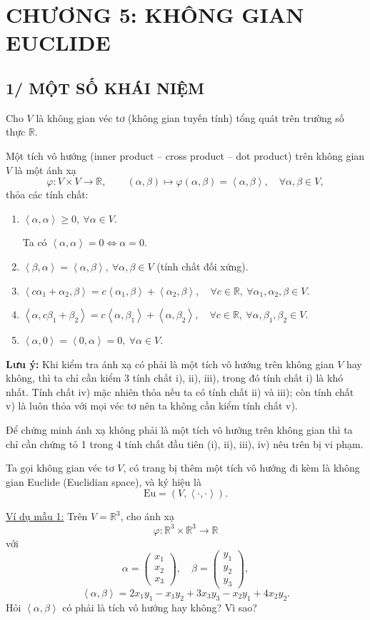 \documentclass[12pt,a4paper]{article}
\newcommand{\R}{\mathbb{R}}
\newcommand{\Eu}{\mathrm{Eu}}
\newcommand{\ip}[2]{\left\langle #1,#2\right\rangle}
\newcommand{\vect}[1]{\begin{pmatrix}#1\end{pmatrix}}
\begin{document}
\section*{CHƯƠNG 5: KHÔNG GIAN EUCLIDE}
\subsection*{1/ MỘT SỐ KHÁI NIỆM}
Cho $V$ là không gian véc tơ (không gian tuyến tính) tổng quát trên trường số thực $\R$.

Một tích vô hướng (inner product -- cross product -- dot product) trên không gian $V$ là một ánh xạ
\[
\varphi:V\times V\to\R,
\qquad
(\alpha,\beta)\mapsto\varphi(\alpha,\beta)=\ip{\alpha}{\beta},
\quad \forall\alpha,\beta\in V,
\]
thỏa các tính chất:
\begin{enumerate}[label=\roman*)]
\item $\ip{\alpha}{\alpha}\ge0,\ \forall\alpha\in V$.

Ta có $\ip{\alpha}{\alpha}=0\Longleftrightarrow\alpha=0$.
\item $\ip{\beta}{\alpha}=\ip{\alpha}{\beta},\ \forall\alpha,\beta\in V$ (tính chất đối xứng).
\item $\ip{c\alpha_1+\alpha_2}{\beta}=c\ip{\alpha_1}{\beta}+\ip{\alpha_2}{\beta},\quad \forall c\in\R,\ \forall\alpha_1,\alpha_2,\beta\in V$.
\item $\ip{\alpha}{c\beta_1+\beta_2}=c\ip{\alpha}{\beta_1}+\ip{\alpha}{\beta_2},\quad \forall c\in\R,\ \forall\alpha,\beta_1,\beta_2\in V$.
\item $\ip{\alpha}{0}=\ip{0}{\alpha}=0,\ \forall\alpha\in V$.
\end{enumerate}

\textbf{Lưu ý:} Khi kiểm tra ánh xạ có phải là một tích vô hướng trên không gian $V$ hay không, thì ta chỉ cần kiểm 3 tính chất i), ii), iii), trong đó tính chất i) là khó nhất. Tính chất iv) mặc nhiên thỏa nếu ta có tính chất ii) và iii); còn tính chất v) là luôn thỏa với mọi véc tơ nên ta không cần kiểm tính chất v).

Để chứng minh ánh xạ không phải là một tích vô hướng trên không gian thì ta chỉ cần chứng tỏ 1 trong 4 tính chất đầu tiên (i), ii), iii), iv) nêu trên bị vi phạm.

Ta gọi không gian véc tơ $V$, có trang bị thêm một tích vô hướng đi kèm là không gian Euclide (Euclidian space), và ký hiệu là
\[
\Eu=(V,\ip{\cdot}{\cdot}).
\]

\underline{Ví dụ mẫu 1:} Trên $V=\R^3$, cho ánh xạ
\[
\varphi:\R^3\times\R^3\to\R
\]
với
\[
\alpha=\vect{x_1\\x_2\\x_3},\quad
\beta=\vect{y_1\\y_2\\y_3},
\]
\[
\ip{\alpha}{\beta}=2x_1y_1-x_1y_2+3x_3y_3-x_2y_1+4x_2y_2.
\]
Hỏi $\ip{\alpha}{\beta}$ có phải là tích vô hướng hay không? Vì sao?
\end{document}
